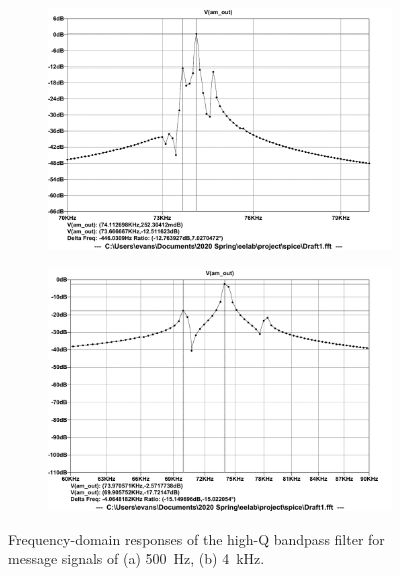 \documentclass[11pt,letter,notitlepage]{article}
\begin{document}
	\begin{figure}[h]
		\centering
		\begin{subfigure}{\linewidth}
			\centering
			\includegraphics[width=0.9\linewidth,clip,trim=0 1.1em 0 1.2em]{highqbpf/highqfft500}
			\caption{}
			\label{fig:highqfft500}
		\end{subfigure}
		
		\begin{subfigure}{\linewidth}
			\centering
			\includegraphics[width=0.9\linewidth,clip,trim=0 1.1em 0 1.2em]{highqbpf/highqfft4k}
			\caption{}
			\label{fig:highqfft4k}
		\end{subfigure}
		
		\caption{Frequency-domain responses of the high-Q bandpass filter for message signals of (a) \SI{500}{\Hz}, (b) \SI{4}{\kHz}.}
		\label{fig:highqfft}
	\end{figure}

	\clearpage %
\end{document}
